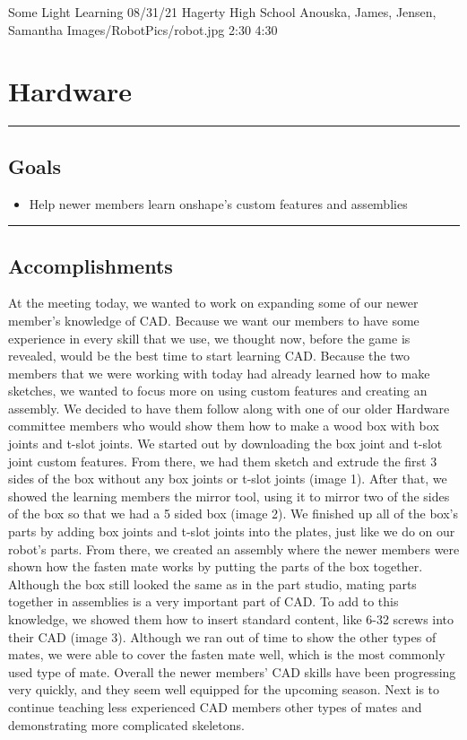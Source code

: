 \insertmeeting 
	{Some Light Learning} 
	{08/31/21}
	{Hagerty High School}
	{Anouska, James, Jensen, Samantha}
	{Images/RobotPics/robot.jpg}
	{2:30}
  {4:30}
	
\section*{Hardware}
\noindent\hfil\rule{\textwidth}{.4pt}\hfil
\subsection*{Goals}
\begin{itemize}
    \item Help newer members learn onshape’s custom features and assemblies
  

\end{itemize} 

\noindent\hfil\rule{\textwidth}{.4pt}\hfil

\subsection*{Accomplishments}
At the meeting today, we wanted to work on expanding some of our newer member’s knowledge of CAD. Because we want our members to have some experience in every skill that we use, we thought now, before the game is revealed, would be the best time to start learning CAD. Because the two members that we were working with today had already learned how to make sketches, we wanted to focus more on using custom features and creating an assembly. We decided to have them follow along with one of our older Hardware committee members who would show them how to make a wood box with box joints and t-slot joints. We started out by downloading the box joint and t-slot joint custom features. From there, we had them sketch and extrude the first 3 sides of the box without any box joints or t-slot joints (image 1). After that, we showed the learning members the mirror tool, using it to mirror two of the sides of the box so that we had a 5 sided box (image 2). We finished up all of the box’s parts by adding box joints and t-slot joints into the plates, just like we do on our robot’s parts. 
From there, we created an assembly where the newer members were shown how the fasten mate works by putting the parts of the box together. Although the box still looked the same as in the part studio, mating parts together in assemblies is a very important part of CAD. To add to this knowledge, we showed them how to insert standard content, like 6-32 screws into their CAD (image 3). Although we ran out of time to show the other types of mates, we were able to cover the fasten mate well, which is the most commonly used type of mate. Overall the newer members’ CAD skills have been progressing very quickly, and they seem well equipped for the upcoming season. Next is to continue teaching less experienced CAD members other types of mates
and demonstrating more complicated skeletons. 


